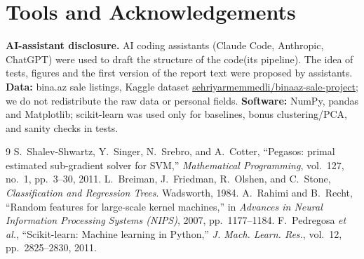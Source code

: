 \documentclass[10pt,twocolumn,a4paper]{article}
\begin{document}
\section*{Tools and Acknowledgements}
\textbf{AI-assistant disclosure.} AI coding assistants (Claude Code, Anthropic, ChatGPT) were used to draft the structure of the code(its pipeline). The idea of tests, figures and the first version of the report text were proposed by assistants. \textbf{Data:} bina.az sale
listings, Kaggle dataset \url{sehriyarmemmedli/binaaz-sale-project}; we
do not redistribute the raw data or personal fields. \textbf{Software:}
NumPy, pandas and Matplotlib; scikit-learn was used only for baselines,
bonus clustering/PCA, and sanity checks in tests.

\begin{thebibliography}{9}
S.~Shalev-Shwartz, Y.~Singer, N.~Srebro, and A.~Cotter,
``Pegasos: primal estimated sub-gradient solver for SVM,''
\emph{Mathematical Programming}, vol.~127, no.~1, pp.~3--30, 2011.
L.~Breiman, J.~Friedman, R.~Olshen, and C.~Stone,
\emph{Classification and Regression Trees}. Wadsworth, 1984.
A.~Rahimi and B.~Recht, ``Random features for large-scale kernel
machines,'' in \emph{Advances in Neural Information Processing Systems
(NIPS)}, 2007, pp.~1177--1184.
F.~Pedregosa \emph{et al.}, ``Scikit-learn: Machine learning in Python,''
\emph{J. Mach. Learn. Res.}, vol.~12, pp.~2825--2830, 2011.
\end{thebibliography}
\end{document}
